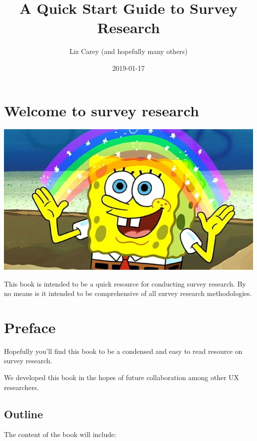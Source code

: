 \documentclass[]{book}
\title{A Quick Start Guide to Survey Research}
\author{Liz Carey (and hopefully many others)}
\date{2019-01-17}
\begin{document}
\maketitle

{
\hypersetup{linkcolor=black}
\setcounter{tocdepth}{1}
\tableofcontents
}
\hypertarget{welcome-to-survey-research}{%
\chapter*{Welcome to survey research}\label{welcome-to-survey-research}}

\includegraphics{figs/sponge_bob.png}

This book is intended to be a quick resource for conducting survey research. By no means is it intended to be comprehensive of all survey research methodologies.

\hypertarget{preface}{%
\chapter*{Preface}\label{preface}}

Hopefully you'll find this book to be a condensed and easy to read resource on survey research.

We developed this book in the hopes of future collaboration among other UX researchers.

\hypertarget{outline}{%
\section*{Outline}\label{outline}}

The content of the book will include:
\end{document}
